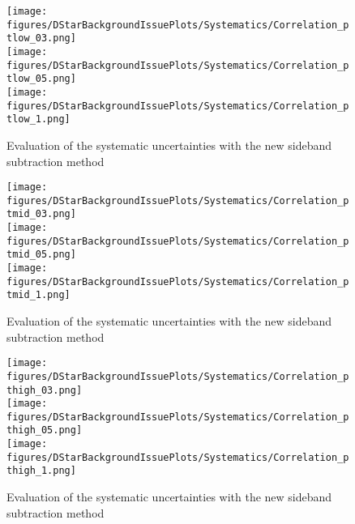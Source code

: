 \begin{figure}
\centering
{\texttt{[image: figures/DStarBackgroundIssuePlots/Systematics/Correlation\_ptlow\_03.png]}}\\
{\texttt{[image: figures/DStarBackgroundIssuePlots/Systematics/Correlation\_ptlow\_05.png]}}\\
{\texttt{[image: figures/DStarBackgroundIssuePlots/Systematics/Correlation\_ptlow\_1.png]}}\\

\caption{Evaluation of the systematic uncertainties with the new sideband subtraction method} 
\label{fig:DStarBkgIssue_newsyst1}
\end{figure}

\begin{figure}
\centering
{\texttt{[image: figures/DStarBackgroundIssuePlots/Systematics/Correlation\_ptmid\_03.png]}}\\
{\texttt{[image: figures/DStarBackgroundIssuePlots/Systematics/Correlation\_ptmid\_05.png]}}\\
{\texttt{[image: figures/DStarBackgroundIssuePlots/Systematics/Correlation\_ptmid\_1.png]}}\\

\caption{Evaluation of the systematic uncertainties with the new sideband subtraction method} 
\label{fig:DStarBkgIssue_newsyst2}
\end{figure}

\begin{figure}
{\texttt{[image: figures/DStarBackgroundIssuePlots/Systematics/Correlation\_pthigh\_03.png]}}\\
{\texttt{[image: figures/DStarBackgroundIssuePlots/Systematics/Correlation\_pthigh\_05.png]}}\\
{\texttt{[image: figures/DStarBackgroundIssuePlots/Systematics/Correlation\_pthigh\_1.png]}}\\


\caption{Evaluation of the systematic uncertainties with the new sideband subtraction method} 
\label{fig:DStarBkgIssue_newsyst3}
\end{figure}



